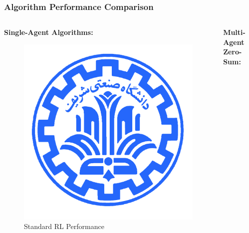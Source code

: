 \documentclass[
    11pt, %
    aspectratio=169, %
]{beamer}
\begin{document}
\begin{frame}
	\frametitle{Algorithm Performance Comparison}
	
	\begin{columns}[t]
		\begin{column}{0.5\textwidth}
			\textbf{Single-Agent Algorithms:}
			\begin{figure}
				\centering
				\includegraphics[width=\textwidth]{single_agent_comparison.png}
				\caption{Standard RL Performance}
			\end{figure}
		\end{column}
		\begin{column}{0.5\textwidth}
			\textbf{Multi-Agent Zero-Sum:}
			\begin{figure}
				\centering

\end{figure}
\end{column}
\end{columns}
\end{frame}
\end{document}
